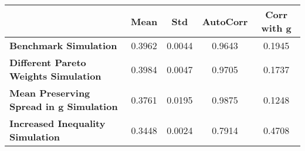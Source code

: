 \begin{tiny}\begin{tabular}{|l|c|c|c|c|}
\hline
&\textbf{Mean}&\textbf{Std}&\textbf{AutoCorr}&\textbf{Corr with g}\\\hline
\textbf{Benchmark Simulation}&0.3962&0.0044&0.9643&0.1945\\\hline
\textbf{Different Pareto Weights Simulation}&0.3984&0.0047&0.9705&0.1737\\\hline
\textbf{Mean Preserving Spread in g Simulation}&0.3761&0.0195&0.9875&0.1248\\\hline
\textbf{Increased Inequality Simulation}&0.3448&0.0024&0.7914&0.4708\\\hline
\end{tabular}
\end{tiny}